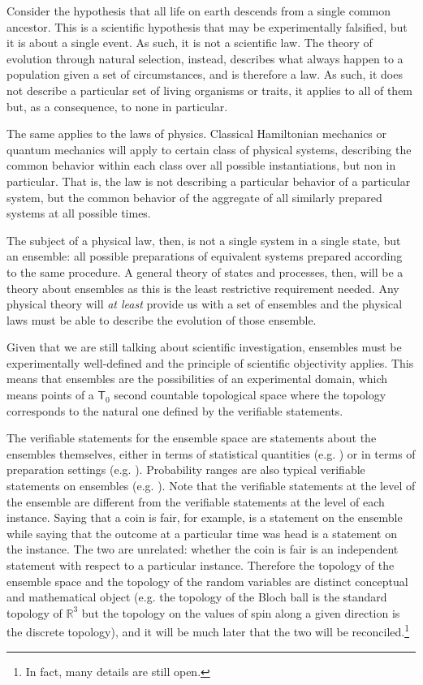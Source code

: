Consider the hypothesis that all life on earth descends from a single common ancestor. This is a scientific hypothesis that may be experimentally falsified, but it is about a single event. As such, it is not a scientific law. The theory of evolution through natural selection, instead, describes what always happen to a population given a set of circumstances, and is therefore a law. As such, it does not describe a particular set of living organisms or traits, it applies to all of them but, as a consequence, to none in particular.

The same applies to the laws of physics. Classical Hamiltonian mechanics or quantum mechanics will apply to certain class of physical systems, describing the common behavior within each class over all possible instantiations, but non in particular. That is, the law is not describing a particular behavior of a particular system, but the common behavior of the aggregate of all similarly prepared systems at all possible times.

The subject of a physical law, then, is not a single system in a single state, but an ensemble: all possible preparations of equivalent systems prepared according to the same procedure. A general theory of states and processes, then, will be a theory about ensembles as this is the least restrictive requirement needed. Any physical theory will \emph{at least} provide us with a set of ensembles and the physical laws must be able to describe the evolution of those ensemble.

Given that we are still talking about scientific investigation, ensembles must be experimentally well-defined and the principle of scientific objectivity applies. This means that ensembles are the possibilities of an experimental domain, which means points of a $\textsf{T}_0$ second countable topological space where the topology corresponds to the natural one defined by the verifiable statements.

The verifiable statements for the ensemble space are statements about the ensembles themselves, either in terms of statistical quantities (e.g. ) or in terms of preparation settings (e.g. ). Probability ranges are also typical verifiable statements on ensembles (e.g. ). Note that the verifiable statements at the level of the ensemble are different from the verifiable statements at the level of each instance. Saying that a coin is fair, for example, is a statement on the ensemble while saying that the outcome at a particular time was head is a statement on the instance. The two are unrelated: whether the coin is fair is an independent statement with respect to a particular instance. Therefore the topology of the ensemble space and the topology of the random variables are distinct conceptual and mathematical object (e.g. the topology of the Bloch ball is the standard topology of $\mathbb{R}^3$ but the topology on the values of spin along a given direction is the discrete topology), and it will be much later that the two will be reconciled.\footnote{In fact, many details are still open.}

